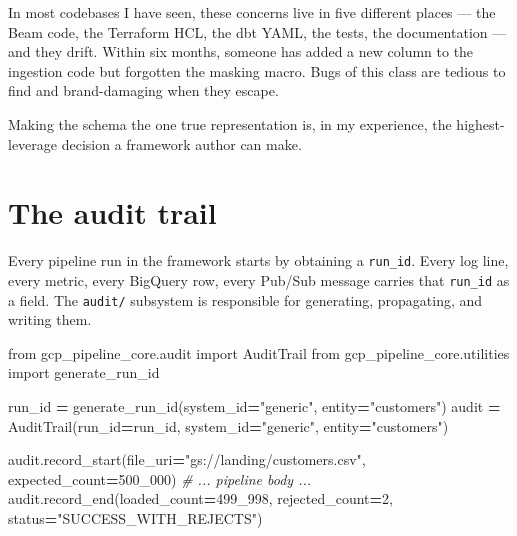 \documentclass[
  11pt,
  british,
  oneside]{book}
\newenvironment{Shaded}{\begin{snugshade}}{\end{snugshade}}
\newcommand{\CommentTok}[1]{\textcolor[rgb]{0.56,0.35,0.01}{\textit{#1}}}
\newcommand{\DecValTok}[1]{\textcolor[rgb]{0.00,0.00,0.81}{#1}}
\newcommand{\ImportTok}[1]{#1}
\newcommand{\NormalTok}[1]{#1}
\newcommand{\OperatorTok}[1]{\textcolor[rgb]{0.81,0.36,0.00}{\textbf{#1}}}
\newcommand{\StringTok}[1]{\textcolor[rgb]{0.31,0.60,0.02}{#1}}
\begin{document}
In most codebases I have seen, these concerns live in five different
places --- the Beam code, the Terraform HCL, the dbt YAML, the tests,
the documentation --- and they drift. Within six months, someone has
added a new column to the ingestion code but forgotten the masking
macro. Bugs of this class are tedious to find and brand-damaging when
they escape.

Making the schema the one true representation is, in my experience, the
highest-leverage decision a framework author can make.

\hypertarget{the-audit-trail}{%
\section{The audit trail}\label{the-audit-trail}}

Every pipeline run in the framework starts by obtaining a
\texttt{run\_id}. Every log line,
every metric, every BigQuery row, every Pub/Sub message carries that
\texttt{run\_id} as a field. The \texttt{audit/} subsystem is
responsible for generating, propagating, and writing them.

\begin{Shaded}
\begin{Highlighting}[]
\ImportTok{from}\NormalTok{ gcp\_pipeline\_core.audit }\ImportTok{import}\NormalTok{ AuditTrail}
\ImportTok{from}\NormalTok{ gcp\_pipeline\_core.utilities }\ImportTok{import}\NormalTok{ generate\_run\_id}

\NormalTok{run\_id }\OperatorTok{=}\NormalTok{ generate\_run\_id(system\_id}\OperatorTok{=}\StringTok{"generic"}\NormalTok{, entity}\OperatorTok{=}\StringTok{"customers"}\NormalTok{)}
\NormalTok{audit }\OperatorTok{=}\NormalTok{ AuditTrail(run\_id}\OperatorTok{=}\NormalTok{run\_id, system\_id}\OperatorTok{=}\StringTok{"generic"}\NormalTok{, entity}\OperatorTok{=}\StringTok{"customers"}\NormalTok{)}

\NormalTok{audit.record\_start(file\_uri}\OperatorTok{=}\StringTok{"gs://landing/customers.csv"}\NormalTok{, expected\_count}\OperatorTok{=}\DecValTok{500\_000}\NormalTok{)}
\CommentTok{\# ... pipeline body ...}
\NormalTok{audit.record\_end(loaded\_count}\OperatorTok{=}\DecValTok{499\_998}\NormalTok{, rejected\_count}\OperatorTok{=}\DecValTok{2}\NormalTok{, status}\OperatorTok{=}\StringTok{"SUCCESS\_WITH\_REJECTS"}\NormalTok{)}
\end{Highlighting}
\end{Shaded}
\end{document}
